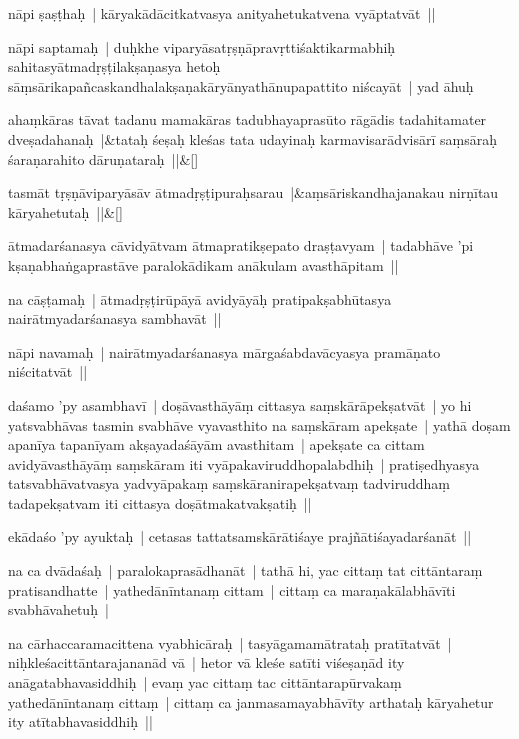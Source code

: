 \documentclass[article,a4paper]{memoir}
\begin{document}
	  \pstart nā\-pi ṣaṣṭhaḥ | kā\-ryakā\-dā\-citkatvasya anityahetukatvena vyā\-ptatvā\-t || 
	\pend
      

	  \pstart nā\-pi saptamaḥ | duḥkhe viparyā\-satṛṣṇā\-pravṛttiśaktikarmabhiḥ sahitasyā\-tmadṛṣṭilakṣaṇasya hetoḥ sā\-ṃsā\-rikapañcaskandhalakṣaṇakā\-ryā\-nyathā\-nupapattito niścayā\-t | yad ā\-huḥ 
	\pend
      
	    
	    \stanza[\smallbreak]
ahaṃkā\-ras tā\-vat tadanu mamakā\-ras tadubhayaprasū\-to rā\-gā\-dis tadahitamater dveṣadahanaḥ |&tataḥ śeṣaḥ kleśas tata udayinaḥ karmavisarā\-dvisā\-rī\- saṃsā\-raḥ śaraṇarahito dā\-ruṇataraḥ ||\&[\smallbreak]


	
	    
	    \stanza[\smallbreak]
tasmā\-t tṛṣṇā\-viparyā\-sā\-v ā\-tmadṛṣṭipuraḥsarau |&aṃsā\-riskandhajanakau nirṇī\-tau kā\-ryahetutaḥ ||\&[\smallbreak]


	

	  \pstart ā\-tmadarśanasya cā\-vidyā\-tvam ā\-tmapratikṣepato draṣṭavyam | tadabhā\-ve 'pi kṣaṇabhaṅgaprastā\-ve paralokā\-dikam anā\-kulam avasthā\-pitam || 
	\pend
      

	  \pstart na cā\-ṣṭamaḥ | ā\-tmadṛṣṭirū\-pā\-yā\- avidyā\-yā\-ḥ pratipakṣabhū\-tasya nairā\-tmyadarśanasya sambhavā\-t || 
	\pend
      

	  \pstart nā\-pi navamaḥ | nairā\-tmyadarśanasya mā\-rgaśabdavā\-cyasya pramā\-ṇato niścitatvā\-t || 
	\pend
      

	  \pstart daśamo 'py asambhavī\- | doṣā\-vasthā\-yā\-ṃ cittasya saṃskā\-rā\-pekṣatvā\-t | yo hi yatsvabhā\-vas tasmin svabhā\-ve vyavasthito na saṃskā\-ram apekṣate | yathā\- doṣam apanī\-ya tapanī\-yam akṣayadaśā\-yā\-m avasthitam | apekṣate ca cittam avidyā\-vasthā\-yā\-ṃ saṃskā\-ram iti vyā\-pakaviruddhopalabdhiḥ | pratiṣedhyasya tatsvabhā\-vatvasya yadvyā\-pakaṃ saṃskā\-ranirapekṣatvaṃ tadviruddhaṃ tadapekṣatvam iti cittasya doṣā\-tmakatvakṣatiḥ || 
	\pend
      

	  \pstart ekā\-daśo 'py ayuktaḥ | cetasas tattatsamskā\-rā\-tiśaye prajñā\-tiśayadarśanā\-t || 
	\pend
      

	  \pstart na ca dvā\-daśaḥ | paralokaprasā\-dhanā\-t | tathā\- hi, yac cittaṃ tat cittā\-ntaraṃ pratisandhatte | yathedā\-nī\-ntanaṃ cittam | cittaṃ ca maraṇakā\-labhā\-vī\-ti svabhā\-vahetuḥ | 
	\pend
      

	  \pstart na cā\-rhaccaramacittena vyabhicā\-raḥ | tasyā\-gamamā\-trataḥ pratī\-tatvā\-t | niḥkleśacittā\-ntarajananā\-d vā\- | hetor vā\- kleśe satī\-ti viśeṣaṇā\-d ity anā\-gatabhavasiddhiḥ | evaṃ yac cittaṃ tac cittā\-ntarapū\-rvakaṃ yathedā\-nī\-ntanaṃ cittaṃ | cittaṃ ca janmasamayabhā\-vī\-ty arthataḥ kā\-ryahetur ity atī\-tabhavasiddhiḥ || 
	\pend
      
\end{document}
